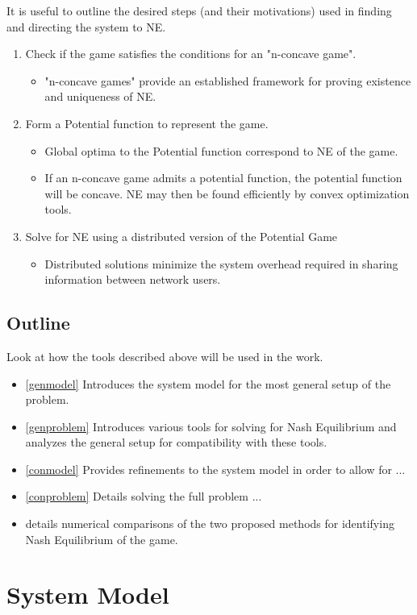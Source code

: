 \documentclass[12pt,a4paper]{report}
\begin{document}
It is useful to outline the desired steps (and their motivations) used in finding and directing the system to NE.
\begin{enumerate}
\item Check if the game satisfies the conditions for an "n-concave game".
\begin{itemize}
\item "n-concave games" provide an established framework for proving existence and uniqueness of NE.
\end{itemize}
\item Form a Potential function to represent the game.
\begin{itemize}
\item Global optima to the Potential function correspond to NE of the game.
\item If an n-concave game admits a potential function, the potential function will be concave. NE may then be found efficiently by convex optimization tools. 
\end{itemize}
\item Solve for NE using a distributed version of the Potential Game 
\begin{itemize}
\item Distributed solutions minimize the system overhead required in sharing information between network users. 
\end{itemize}
\end{enumerate}


\section{Outline}
Look at how the tools described above will be used in the work. 
\begin{itemize}
\item 
\ref{genmodel} Introduces the system model for the most general setup of the problem.
\item 
\ref{genproblem} Introduces various tools for solving for Nash Equilibrium and analyzes the general setup for compatibility with these tools. 
\item
\ref{conmodel} Provides refinements to the system model in order to allow for ...
\item 
\ref{conproblem} Details solving the full problem ...
\item 
details numerical comparisons of the two proposed methods for identifying Nash Equilibrium of the game. 
\end{itemize}
\chapter{System Model}
\end{document}
